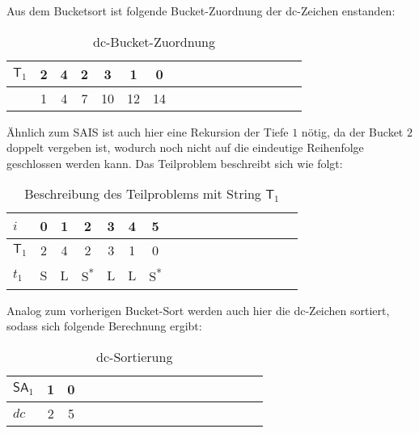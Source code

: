 \noindent Aus dem Bucketsort ist folgende Bucket-Zuordnung der dc-Zeichen enstanden:

\begin{table}[H]
\centering
  \begin{tabular}{ | l | c | c | c | c | c | c | c | c | c | c | c | c | c | c | c | c | }
    \hline
        $\mathsf{T}_1$ & 2 & 4 & 2 & 3 & 1 & 0 \\ \hline
              & 1 & 4 & 7 & 10 & 12 & 14  \\
    \hline
  \end{tabular}
  \caption{dc-Bucket-Zuordnung}
\end{table}
\bigskip
Ähnlich zum SAIS ist auch hier eine Rekursion der Tiefe $1$ nötig, da der Bucket $2$ doppelt vergeben ist, wodurch noch nicht auf die eindeutige Reihenfolge geschlossen werden kann. Das Teilproblem beschreibt sich wie folgt:

\begin{table}[H]
\centering
  \begin{tabular}{ | l | c | c | c | c | c | c | c | c | c | c | c | c | c | c | c | c | }
    \hline
        $i$ & 0 & 1 & 2 & 3 & 4 & 5 \\ \hline
      $\mathsf{T}_1$ & 2 & 4 & 2 & 3 & 1 & 0  \\ \hline
      $t_1$ & S & L & S\textsuperscript{*} & L & L & S\textsuperscript{*} \\
    \hline
  \end{tabular}
  \caption{Beschreibung des Teilproblems mit String $\mathsf{T}_1$}
\end{table}
\bigskip

\noindent Analog zum vorherigen Bucket-Sort werden auch hier die dc-Zeichen sortiert, sodass sich folgende Berechnung ergibt:

\begin{table}[H]
\centering
  \begin{tabular}{ | l | c | c | c | c | c | c | c | c | c | c | c | c | c | c | c | c | }
    \hline
        $\mathsf{SA}_1$ & 1 & 0 \\ \hline
        $dc$ & 2 & 5 \\
    \hline
  \end{tabular}
  \caption{dc-Sortierung}
\end{table}
\bigskip

